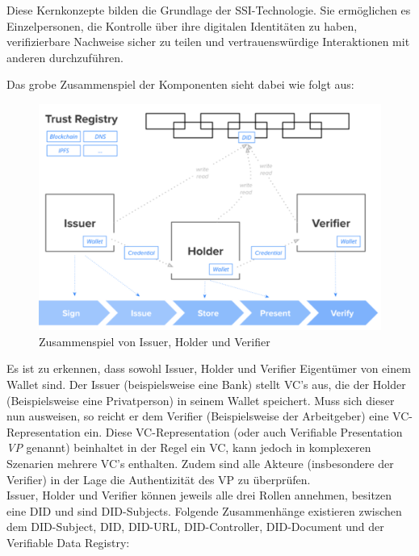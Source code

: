 Diese Kernkonzepte bilden die Grundlage der SSI-Technologie. Sie ermöglichen es Einzelpersonen, die Kontrolle über ihre digitalen Identitäten zu haben, verifizierbare Nachweise sicher zu teilen und vertrauenswürdige Interaktionen mit anderen durchzuführen.


Das grobe Zusammenspiel der Komponenten sieht dabei wie folgt aus:

\begin{figure}[h]
	\centering
	\includegraphics[scale=0.3]{media/zusammenspiel.png}
	\caption{Zusammenspiel von Issuer, Holder und Verifier \cite{ID62}}
	\label{fig:meine-grafik}
\end{figure}

Es ist zu erkennen, dass sowohl Issuer, Holder und Verifier Eigentümer von einem Wallet sind. Der Issuer (beispielsweise eine Bank) stellt VC's aus, die der Holder (Beispielsweise eine Privatperson) in seinem Wallet speichert. Muss sich dieser nun ausweisen, so reicht er dem Verifier (Beispielsweise der Arbeitgeber) eine VC-Representation ein. Diese VC-Representation (oder auch Verifiable Presentation \textsl{VP} genannt) beinhaltet in der Regel ein VC, kann jedoch in komplexeren Szenarien mehrere VC's enthalten. Zudem sind alle Akteure (insbesondere der Verifier) in der Lage die Authentizität des VP zu überprüfen.\\

Issuer, Holder und Verifier können jeweils alle drei Rollen annehmen, besitzen eine DID und sind DID-Subjects. Folgende Zusammenhänge existieren zwischen dem DID-Subject, DID, DID-URL, DID-Controller, DID-Document und der Verifiable Data Registry:

